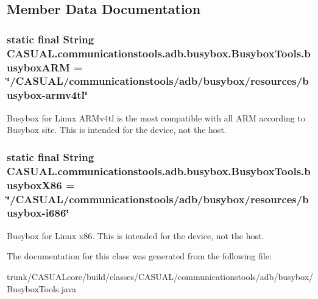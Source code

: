 \subsection{Member Data Documentation}
\hypertarget{class_c_a_s_u_a_l_1_1communicationstools_1_1adb_1_1busybox_1_1_busybox_tools_a75a2a1e0c7f9d71907c9ffcea2dba5ee}{
\subsubsection[{busybox\-A\-R\-M}]{\setlength{\rightskip}{0pt plus 5cm}static final String C\-A\-S\-U\-A\-L.\-communicationstools.\-adb.\-busybox.\-Busybox\-Tools.\-busybox\-A\-R\-M = \char`\"{}/C\-A\-S\-U\-A\-L/communicationstools/adb/busybox/resources/busybox-\/armv4tl\char`\"{}\hspace{0.3cm}{\ttfamily [static]}}}\label{class_c_a_s_u_a_l_1_1communicationstools_1_1adb_1_1busybox_1_1_busybox_tools_a75a2a1e0c7f9d71907c9ffcea2dba5ee}
Busybox for Linux A\-R\-Mv4tl is the most compatible with all A\-R\-M according to Busybox site. This is intended for the device, not the host. \hypertarget{class_c_a_s_u_a_l_1_1communicationstools_1_1adb_1_1busybox_1_1_busybox_tools_a014e27bbf420fbb29f8ba8d929bbafca}{
\subsubsection[{busybox\-X86}]{\setlength{\rightskip}{0pt plus 5cm}static final String C\-A\-S\-U\-A\-L.\-communicationstools.\-adb.\-busybox.\-Busybox\-Tools.\-busybox\-X86 = \char`\"{}/C\-A\-S\-U\-A\-L/communicationstools/adb/busybox/resources/busybox-\/i686\char`\"{}\hspace{0.3cm}{\ttfamily [static]}}}\label{class_c_a_s_u_a_l_1_1communicationstools_1_1adb_1_1busybox_1_1_busybox_tools_a014e27bbf420fbb29f8ba8d929bbafca}
Busybox for Linux x86. This is intended for the device, not the host. 

The documentation for this class was generated from the following file\-:\begin{DoxyCompactItemize}
\item 
trunk/\-C\-A\-S\-U\-A\-Lcore/build/classes/\-C\-A\-S\-U\-A\-L/communicationstools/adb/busybox/Busybox\-Tools.\-java\end{DoxyCompactItemize}
